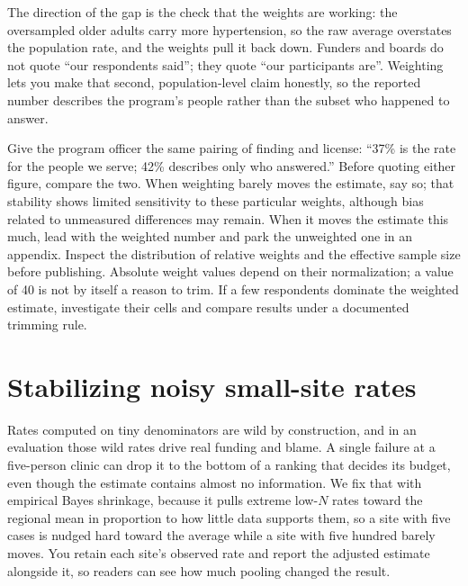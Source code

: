 \documentclass[
    a4paper,
    fontsize=10pt,
    twoside=true,
    numbers=noenddot,
]{kaobook}
\begin{document}
The direction of the gap is the check that the weights are working: the oversampled older adults carry more hypertension, so the raw average overstates the population rate, and the weights pull it back down. Funders and boards do not quote \enquote{our respondents said}; they quote \enquote{our participants are}. Weighting lets you make that second, population-level claim honestly, so the reported number describes the program's people rather than the subset who happened to answer.

Give the program officer the same pairing of finding and license: \enquote{37\% is the rate for the people we serve; 42\% describes only who answered.} Before quoting either figure, compare the two. When weighting barely moves the estimate, say so; that stability shows limited sensitivity to these particular weights, although bias related to unmeasured differences may remain. When it moves the estimate this much, lead with the weighted number and park the unweighted one in an appendix. Inspect the distribution of relative weights and the effective sample size before publishing. Absolute weight values depend on their normalization; a value of 40 is not by itself a reason to trim. If a few respondents dominate the weighted estimate, investigate their cells and compare results under a documented trimming rule.

\section{Stabilizing noisy small-site rates}\label{sec:shrink}
Rates computed on tiny denominators are wild by construction, and in an evaluation those wild rates drive real funding and blame. A single failure at a five-person clinic can drop it to the bottom of a ranking that decides its budget, even though the estimate contains almost no information. We fix that with empirical Bayes shrinkage, because it pulls extreme low-$N$ rates toward the regional mean in proportion to how little data supports them, so a site with five cases is nudged hard toward the average while a site with five hundred barely moves. You retain each site's observed rate and report the adjusted estimate alongside it, so readers can see how much pooling changed the result.
\end{document}
